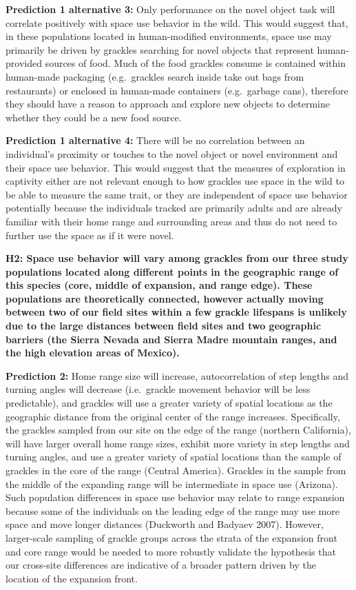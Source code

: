 \documentclass[
]{article}
\begin{document}
\textbf{Prediction 1 alternative 3:} Only performance on the novel
object task will correlate positively with space use behavior in the
wild. This would suggest that, in these populations located in
human-modified environments, space use may primarily be driven by
grackles searching for novel objects that represent human-provided
sources of food. Much of the food grackles consume is contained within
human-made packaging (e.g.~grackles search inside take out bags from
restaurants) or enclosed in human-made containers (e.g.~garbage cans),
therefore they should have a reason to approach and explore new objects
to determine whether they could be a new food source.

\textbf{Prediction 1 alternative 4:} There will be no correlation
between an individual's proximity or touches to the novel object or
novel environment and their space use behavior. This would suggest that
the measures of exploration in captivity either are not relevant enough
to how grackles use space in the wild to be able to measure the same
trait, or they are independent of space use behavior potentially because
the individuals tracked are primarily adults and are already familiar
with their home range and surrounding areas and thus do not need to
further use the space as if it were novel.

\textbf{H2: Space use behavior will vary among grackles from our three
study populations located along different points in the geographic range
of this species (core, middle of expansion, and range edge). These
populations are theoretically connected, however actually moving between
two of our field sites within a few grackle lifespans is unlikely due to
the large distances between field sites and two geographic barriers (the
Sierra Nevada and Sierra Madre mountain ranges, and the high elevation
areas of Mexico).}

\textbf{Prediction 2:} Home range size will increase, autocorrelation of
step lengths and turning angles will decrease (i.e.~grackle movement
behavior will be less predictable), and grackles will use a greater
variety of spatial locations as the geographic distance from the
original center of the range increases. Specifically, the grackles
sampled from our site on the edge of the range (northern California),
will have larger overall home range sizes, exhibit more variety in step
lengths and turning angles, and use a greater variety of spatial
locations than the sample of grackles in the core of the range (Central
America). Grackles in the sample from the middle of the expanding range
will be intermediate in space use (Arizona). Such population differences
in space use behavior may relate to range expansion because some of the
individuals on the leading edge of the range may use more space and move
longer distances (Duckworth and Badyaev 2007). However, larger-scale
sampling of grackle groups across the strata of the expansion front and
core range would be needed to more robustly validate the hypothesis that
our cross-site differences are indicative of a broader pattern driven by
the location of the expansion front.
\end{document}
